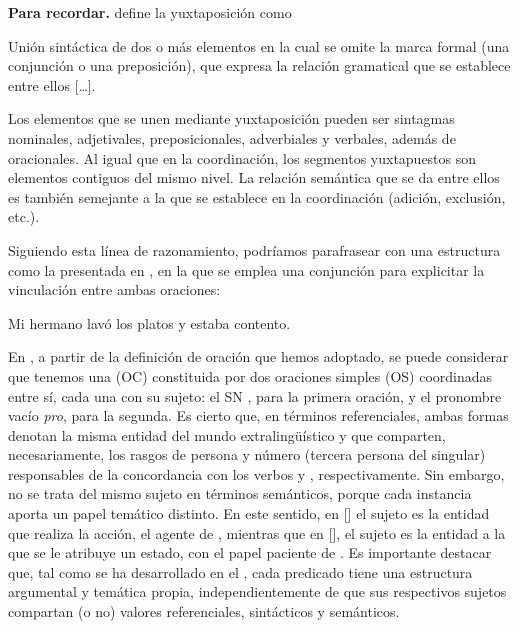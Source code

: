 \begin{destacado}
\textbf{Para recordar.} \textcite[334]{bosque2019} define la yuxtaposición como

\begin{cita}
Unión sintáctica de dos o más elementos en la cual se omite la marca formal (una
conjunción o una preposición), que expresa la relación gramatical que se
establece entre ellos [\ldots].
\end{cita}

Los elementos que se unen mediante yuxtaposición pueden ser sintagmas nominales,
adjetivales, preposicionales, adverbiales y verbales, además de oracionales. Al
igual que en la coordinación, los segmentos yuxtapuestos son elementos contiguos
del mismo nivel. La relación semántica que se da entre ellos es también semejante
a la que se establece en la coordinación (adición, exclusión, etc.).
\end{destacado}

Siguiendo esta línea de razonamiento, podríamos parafrasear
 con una estructura como la presentada en
, en la que se emplea una conjunción para explicitar la
vinculación entre ambas oraciones:

\begin{exe}
  \ex\label{ex:12-hermano4} Mi hermano lavó los platos y estaba contento.
\end{exe}

En , a partir de la definición de oración que hemos
adoptado, se puede considerar que tenemos una  (OC)
constituida por dos oraciones simples (OS) coordinadas entre sí, cada una con su
sujeto: el SN , para la primera oración, y el pronombre vacío
\textit{pro}, para la segunda. Es cierto que, en términos referenciales, ambas
formas denotan la misma entidad del mundo extralingüístico y que comparten,
necesariamente, los rasgos de persona y número (tercera persona del singular)
responsables de la concordancia con los verbos  y ,
respectivamente. Sin embargo, no se trata del mismo sujeto en términos
semánticos, porque cada instancia aporta un papel temático distinto. En este
sentido, en [] el sujeto es la entidad que
realiza la acción, el agente de , mientras que en [], el sujeto es la entidad a la que se le atribuye un estado, con
el papel paciente de . Es importante destacar que, tal como
se ha desarrollado en el , cada predicado tiene una estructura
argumental y temática propia, independientemente de que sus respectivos sujetos
compartan (o no) valores referenciales, sintácticos y semánticos.

